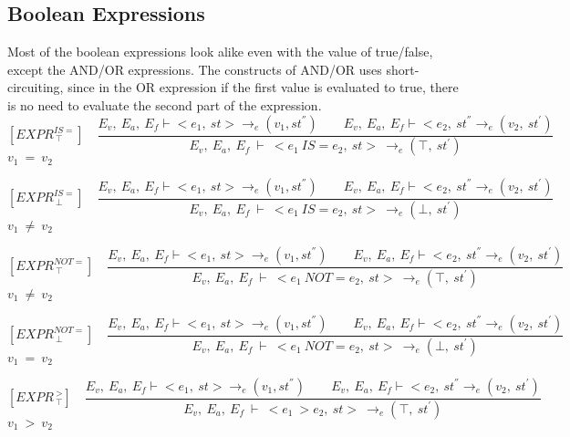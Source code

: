    	\subsection{Boolean Expressions}
   	Most of the boolean expressions look alike even with the value of true/false, except the AND/OR expressions. The constructs of AND/OR uses short-circuiting, since in the OR expression if the first value is evaluated to true, there is no need to evaluate the second part of the expression.
   	\[
   	[EXPR^{IS=}_{\ \top}] \quad
   	\dfrac{E_v, \ E_a, \ E_f \vdash <e_1, \ st> \rightarrow_e (v_1, st^{''}) \qquad E_v, \ E_a, \ E_f \vdash <e_2, \ st^{''} \rightarrow_e (v_2, \ st^{'})}{E_v, \ E_a, \ E_f \ \vdash \ <e_1
   	\ IS= e_2, \ st> \ \rightarrow_e (\top, \ st^{'})}
   	\]
   	\begin{math}
   	v_1 \ = \ v_2 
   	\end{math}

   	\[
   	[EXPR^{IS=}_{\ \bot}] \quad
   	\dfrac{E_v, \ E_a, \ E_f \vdash <e_1, \ st> \rightarrow_e (v_1, st^{''}) \qquad E_v, \ E_a, \ E_f \vdash <e_2, \ st^{''} \rightarrow_e (v_2, \ st^{'})}{E_v, \ E_a, \ E_f \ \vdash \ <e_1
   	\ IS= e_2, \ st> \ \rightarrow_e (\bot, \ st^{'})}
   	\]
	\begin{math}
   	v_1 \ \not= \ v_2
   	\end{math}


   	\[
   	[EXPR^{NOT=}_{\ \top}] \quad
   	\dfrac{E_v, \ E_a, \ E_f \vdash <e_1, \ st> \rightarrow_e (v_1, st^{''}) \qquad E_v, \ E_a, \ E_f \vdash <e_2, \ st^{''} \rightarrow_e (v_2, \ st^{'})}{E_v, \ E_a, \ E_f \ \vdash \ <e_1 \ NOT= e_2, \ st> \ \rightarrow_e (\top, \ st^{'})}
   	\]
	\begin{math}
   	v_1 \ \not= \ v_2
   	\end{math}   	
   	

   	\[
   	[EXPR^{NOT=}_{\ \bot}] \quad
   	\dfrac{E_v, \ E_a, \ E_f \vdash <e_1, \ st> \rightarrow_e (v_1, st^{''}) \qquad E_v, \ E_a, \ E_f \vdash <e_2, \ st^{''} \rightarrow_e (v_2, \ st^{'})}{E_v, \ E_a, \ E_f \ \vdash \ <e_1 \ NOT= e_2, \ st> \ \rightarrow_e (\bot, \ st^{'})}
   	\]
	\begin{math}
   	v_1 \ = \ v_2
   	\end{math}   	
   	
   	
   	\[
   	[EXPR^{\ >}_{\ \top}] \quad
   	\dfrac{E_v, \ E_a, \ E_f \vdash <e_1, \ st> \rightarrow_e (v_1, st^{''}) \qquad E_v, \ E_a, \ E_f \vdash <e_2, \ st^{''} \rightarrow_e (v_2, \ st^{'})}{E_v, \ E_a, \ E_f \ \vdash \ <e_1 \ > e_2, \ st> \ \rightarrow_e (\top, \ st^{'})}
   	\]
	\begin{math}
   	v_1 \ > \ v_2
   	\end{math}   	
   	
